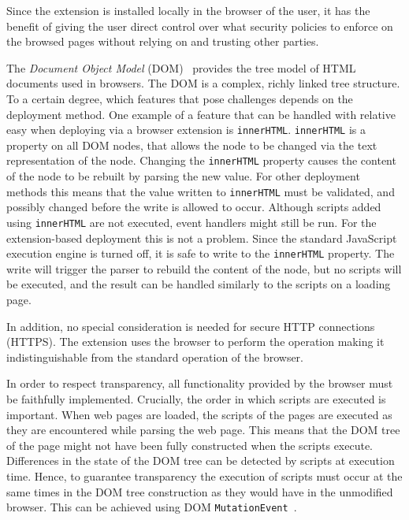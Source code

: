 \documentclass{llncs}
\begin{document}
Since the extension is installed locally in the browser of the user, it has
the benefit of giving the user direct control over what security policies to 
enforce on the browsed pages without relying on and trusting other parties.

The \emph{Document Object Model} (DOM)~\cite{DOM2} provides the tree model of HTML
documents used in browsers. The DOM is a complex, richly linked tree structure.
To a certain degree, which features that pose challenges depends on the deployment method. One example of a feature that can be handled with 
relative easy when deploying via a browser extension is 
\lstinline{innerHTML}. \lstinline{innerHTML} is a property on all DOM nodes,
that allows the node to be changed via the text representation of the node. 
Changing the \lstinline{innerHTML} property 
causes the content of the node to be rebuilt by parsing the new value. For other deployment methods this means that the value written to
\lstinline{innerHTML} must be validated, and possibly changed before the write
is allowed to occur. Although scripts added using \lstinline{innerHTML}
are not executed, event handlers might still be run.
%
For the extension-based deployment this is not a problem.  Since the standard
JavaScript execution engine is turned off, it is safe to write to the
\lstinline{innerHTML} property. The write will trigger the parser to rebuild
the content of the node, but no scripts will be executed, and the result can be
handled similarly to the scripts on a loading page.

In addition, no special consideration is needed for secure HTTP connections
(HTTPS). The extension uses the browser to perform the operation making
it indistinguishable from the standard operation of the browser.

In order to respect transparency, all
functionality provided by the browser must be faithfully implemented.
%
Crucially, the order in which scripts are executed is important.  When web pages
are loaded, the scripts of the pages are executed as they are encountered while
parsing the web page. This means that the DOM tree of the page might not have
been fully constructed when the scripts execute. Differences in the state of
the DOM tree can be detected by scripts at execution time. Hence, to guarantee
transparency the execution of scripts must occur at the same times in the DOM
tree construction as they would have in the unmodified browser.
This can be achieved using DOM \lstinline{MutationEvent}~\cite{DOM3Event}.
\end{document}
